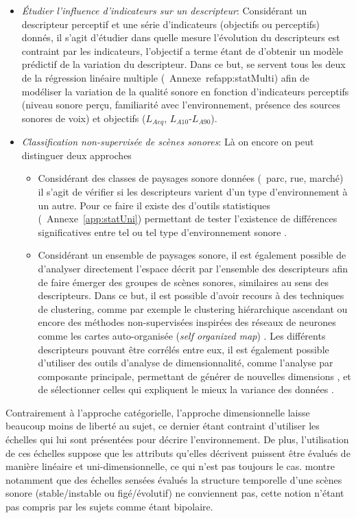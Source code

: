 \begin{itemize}
\item \emph{Étudier l'influence d'indicateurs sur un descripteur}: Considérant un descripteur perceptif et une série d'indicateurs (objectifs ou perceptifs) donnés, il s'agit d'étudier dans quelle mesure l'évolution du descripteurs est contraint par les indicateurs, l'objectif a terme étant de d'obtenir un modèle prédictif de la variation du descripteur. Dans ce but, \citep{lavandier2006contribution,ricciardi2015sound} se servent tous les deux de la régression linéaire multiple (\Cf~Annexe~ref{app:statMulti}) afin de modéliser la variation de la qualité sonore en fonction d'indicateurs perceptifs (niveau sonore perçu, familiarité avec l'environnement, présence des sources sonores de voix) et objectifs ($L_{Aeq}$, $L_{A10}$-$L_{A90}$).

\item \emph{Classification non-supervisée de scènes sonores}: Là on encore on peut distinguer deux approches

\begin{itemize}
\item Considérant des classes de paysages sonore données (\eg~parc, rue, marché) il s'agit de vérifier si les descripteurs varient  d'un type d'environnement à un autre. Pour ce faire il existe des d'outils statistiques (\Cf~Annexe~\ref{app:statUni}) permettant de tester l'existence de différences significatives entre tel ou tel type d'environnement sonore \citep{hong2013designing}. 
\item Considérant un ensemble de paysages sonore, il est également possible de d'analyser directement l'espace décrit par l'ensemble des descripteurs afin de faire émerger des groupes de scènes sonores, similaires au sens des descripteurs. Dans ce but, il est possible d'avoir recours à des techniques de clustering, comme par exemple le clustering hiérarchique ascendant \citep{torija2013application} ou encore des méthodes non-supervisées inspirées des réseaux de neurones comme les cartes auto-organisée (\emph{self organized map}) \citep{ricciardi2015sound}. Les différents descripteurs pouvant être corrélés entre eux, il est également possible d'utiliser des outils d'analyse de dimensionnalité, comme l'analyse par composante principale, permettant de générer de nouvelles dimensions , et de sélectionner celles qui expliquent le mieux la variance des données . 
\end{itemize}

\end{itemize}

Contrairement à l'approche catégorielle, l'approche dimensionnelle laisse beaucoup moins de  liberté au sujet, ce dernier étant contraint d'utiliser les échelles qui lui sont présentées pour décrire l'environnement. De plus, l'utilisation de ces échelles suppose que les attributs qu'elles décrivent puissent être évalués de manière linéaire et uni-dimensionnelle, ce qui n'est pas toujours le cas. \citep{raimbault2006qualitative} montre notamment que des échelles sensées évalués la structure temporelle d'une scènes sonore (stable/instable ou figé/évolutif) ne conviennent pas, cette notion n'étant pas compris par les sujets comme étant bipolaire.

